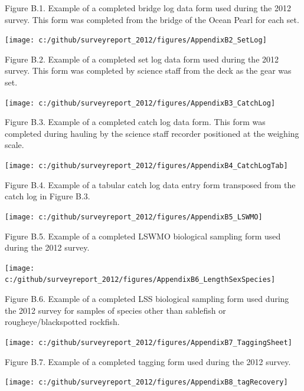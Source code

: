 \documentclass[12pt]{article}\usepackage[]{graphicx}\usepackage[]{color}
\begin{document}
\begin{appendices}
Figure B.1. Example of a completed bridge log data form used during the 2012 survey. This form was completed from the bridge of the Ocean Pearl for each set.

\clearpage
\begin{center}\texttt{[image: c:/github/surveyreport\_2012/figures/AppendixB2\_SetLog]} \end{center}

Figure B.2. Example of a completed set log data form used during the 2012 survey. This form was completed by science staff from the deck as the gear was set.

\clearpage
\begin{center}\texttt{[image: c:/github/surveyreport\_2012/figures/AppendixB3\_CatchLog]} \end{center}

Figure B.3. Example of a completed catch log data form. This form was completed during hauling by the science staff recorder positioned at the weighing scale. \clearpage
\begin{center}\texttt{[image: c:/github/surveyreport\_2012/figures/AppendixB4\_CatchLogTab]} \end{center}

Figure B.4. Example of a tabular catch log data entry form transposed from the catch log in Figure B.3.

\clearpage
\begin{center}\texttt{[image: c:/github/surveyreport\_2012/figures/AppendixB5\_LSWMO]} \end{center}

Figure B.5. Example of a completed LSWMO biological sampling form used during the 2012 survey.

\clearpage
\begin{center}\texttt{[image: c:/github/surveyreport\_2012/figures/AppendixB6\_LengthSexSpecies]} \end{center}

Figure B.6. Example of a completed LSS biological sampling form used during the 2012 survey for samples of species other than sablefish or rougheye/blackspotted rockfish.

\clearpage
\begin{center}\texttt{[image: c:/github/surveyreport\_2012/figures/AppendixB7\_TaggingSheet]} \end{center}

Figure B.7. Example of a completed tagging form used during the 2012 survey.

\clearpage
\begin{center}\texttt{[image: c:/github/surveyreport\_2012/figures/AppendixB8\_tagRecovery]} \end{center}


\end{appendices}
\end{document}
